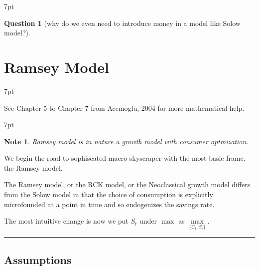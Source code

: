 \documentclass{article}
\newcommand*\sepline{%
  \begin{center}
    \rule[1ex]{.5\textwidth}{.5pt}
  \end{center}}
\newenvironment{blueblock}{
\def\FrameCommand{
  \hspace{1pt}
    {\color{DarkBlue}
    \vrule width 2pt}
    {\color{blueshade}
    \vrule width 4pt}
  \colorbox{blueshade}
}
\MakeFramed{
  \advance
  \hsize-
  \width
  \FrameRestore}
\noindent\hspace{-4.55pt}%
\begin{adjustwidth}{}{7pt}
\vspace{2pt}\vspace{2pt}
}
{\vspace{2pt}\end{adjustwidth}\endMakeFramed}
\newenvironment{greenblock}{%
\def\FrameCommand{%
  \hspace{1pt}%
    {\color{Green}%
    \vrule width 2pt}%
    {\color{greenshade}%
    \vrule width 4pt}%
  \colorbox{greenshade}%
}%
\MakeFramed{%
  \advance%
  \hsize-%
  \width%
  \FrameRestore}%
\noindent\hspace{-4.55pt}%
\begin{adjustwidth}{}{7pt}%
\vspace{2pt}\vspace{2pt}%
}
{%
\vspace{2pt}\end{adjustwidth}\endMakeFramed%
}
\newenvironment{redblock}{
\def\FrameCommand{
  \hspace{1pt}
    {\color{LightCoral}
    \vrule width 2pt}
    {\color{redshade}
    \vrule width 4pt}
  \colorbox{redshade}
}
\MakeFramed{
  \advance
  \hsize-
  \width
  \FrameRestore}
\noindent\hspace{-4.55pt}%
\begin{adjustwidth}{}{7pt}
\vspace{2pt}\vspace{2pt}
}
{\vspace{2pt}\end{adjustwidth}\endMakeFramed}
\newtheorem{question}{Question}
\newtheorem{note}{Note}
\begin{document}
\begin{redblock}
\begin{question}[why do we even need to introduce money in a model like Solow model?]
\end{question}
\end{redblock}





\newpage
\section{Ramsey Model}

\begin{greenblock}
See Chapter 5 to Chapter 7 from Acemoglu, 2004 for more mathematical help.
\end{greenblock}


\begin{blueblock}
\begin{note}
Ramsey model is in nature a growth model with consumer optmization.
\end{note}
\end{blueblock}


We begin the road to sophiscated macro skyscraper with the most basic frame, the Ramsey model. 

The Ramsey model, or the RCK model, or the Neoclassical growth model differs from the Solow model in that the choice of consumption is explicitly microfounded at a point in time and so endogenizes the savings rate. 

The most intuitive change is now we put $S_t$ under $\max$ as $\max\limits_{\{C_t, S_t\}}$.

\sepline
\subsection{Assumptions}\label{assumptions}
\end{document}
